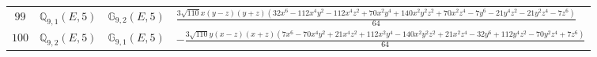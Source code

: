 \documentclass[fleqn,8pt,landscape]{jsarticle}
\begin{document}
\begin{table}[ht!]
\begin{center}
\begin{tabular}{cccl}
$ 99 $ & $ \mathbb{Q}_{9,1}(E,5) $ & $ \mathbb{G}_{9,2}(E,5) $ & $ \frac{3 \sqrt{110} x \left(y - z\right) \left(y + z\right) \left(32 x^{6} - 112 x^{4} y^{2} - 112 x^{4} z^{2} + 70 x^{2} y^{4} + 140 x^{2} y^{2} z^{2} + 70 x^{2} z^{4} - 7 y^{6} - 21 y^{4} z^{2} - 21 y^{2} z^{4} - 7 z^{6}\right)}{64} $ \\
$ 100 $ & $ \mathbb{Q}_{9,2}(E,5) $ & $ \mathbb{G}_{9,1}(E,5) $ & $ - \frac{3 \sqrt{110} y \left(x - z\right) \left(x + z\right) \left(7 x^{6} - 70 x^{4} y^{2} + 21 x^{4} z^{2} + 112 x^{2} y^{4} - 140 x^{2} y^{2} z^{2} + 21 x^{2} z^{4} - 32 y^{6} + 112 y^{4} z^{2} - 70 y^{2} z^{4} + 7 z^{6}\right)}{64} $ \\
 \hline \hline
\end{tabular}
\end{center}
\end{table}
\end{document}
